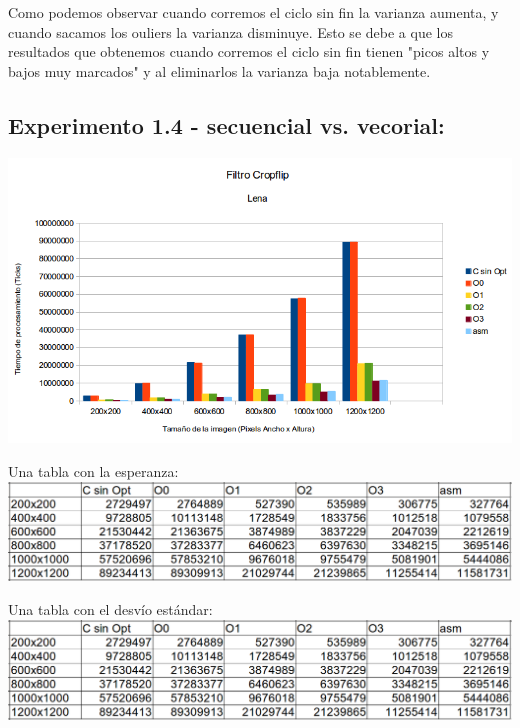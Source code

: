 \documentclass[a4paper]{article}
\begin{document}
Como podemos observar cuando corremos el ciclo sin fin la varianza aumenta, y cuando sacamos los ouliers la varianza disminuye.\newline
Esto se debe a que los resultados que obtenemos cuando corremos el ciclo sin fin tienen "picos altos y bajos muy marcados" y al eliminarlos la varianza baja notablemente.
\newpage

\subsection{Experimento 1.4 - secuencial vs. vecorial:}

\vspace{0.4cm}
\includegraphics[width=\textwidth,height=\textheight,keepaspectratio
]{graficoOpt.png}
\begin {flushleft}
\end{flushleft}
Una tabla con la esperanza: \newline
\includegraphics[width=\textwidth,height=\textheight,keepaspectratio
]{tablaEsperanzaOpt.png}
\begin {flushleft}
\end{flushleft}

Una tabla con el desvío estándar:\newline
\includegraphics[width=\textwidth,height=\textheight,keepaspectratio
]{tablaEsperanzaOpt.png}
\begin {flushleft}
\end{flushleft}
\end{document}

